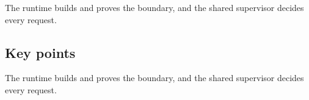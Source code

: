 \begin{takeaway}The runtime builds and proves the boundary, and the shared supervisor decides every request.\end{takeaway}

\subsection*{Key points}
\bi
\item The runtime builds and proves the boundary, and the shared supervisor decides every request.
\ei
